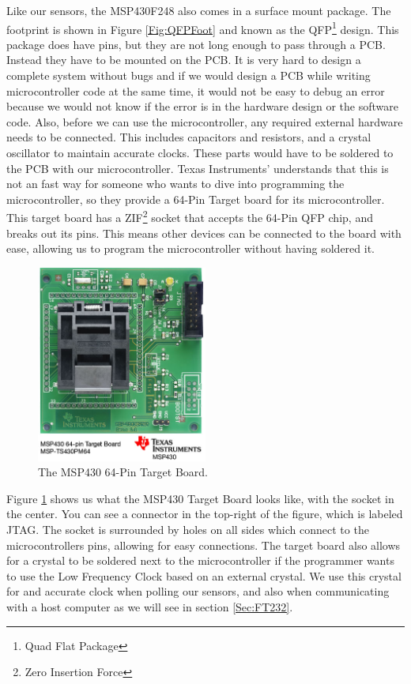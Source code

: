Like our sensors, the MSP430F248 also comes in a surface mount package.
The footprint is shown in Figure \ref{Fig:QFPFoot}
and known as the QFP\footnote{Quad Flat Package} design.
This package does have pins, but they are not long enough to pass through a PCB.
Instead they have to be mounted on the PCB.
It is very hard to design a complete system without bugs and if we would design a PCB
while writing microcontroller code at the same time,
it would not be easy to debug an error because we would not know if the error
is in the hardware design or the software code.
Also, before we can use the microcontroller,
any required external hardware needs to be connected.
This includes capacitors and resistors,
and a crystal oscillator to maintain accurate clocks.
These parts would have to be soldered to the PCB with our microcontroller.
Texas Instruments' understands that this is not an fast way for someone who wants to dive into programming the microcontroller,
so they provide a 64-Pin Target board for its microcontroller. This target board has
a ZIF\footnote{Zero Insertion Force} socket that accepts the 64-Pin QFP chip,
and breaks out its pins. This means other devices can be connected to the board with ease,
allowing us to program the microcontroller without having soldered it.
\begin{figure}
\begin{center}
\includegraphics[width=0.5\textwidth]{images/mspts430pm64.jpg}
\caption{The MSP430 64-Pin Target Board.}
\label{Fig:MSPTarget}
\end{center}
\end{figure}

Figure \ref{Fig:MSPTarget} shows us what the MSP430 Target Board \cite{Web:MSPTarget} looks like, with the socket in the center. You can see a connector in the top-right of the figure, which is labeled JTAG. The socket is surrounded by holes on all sides which connect to the microcontrollers pins, allowing for easy connections. The target board also allows for a crystal to be soldered next to the microcontroller if the programmer wants to use the Low Frequency Clock based on an external crystal. We use this crystal for and accurate clock when polling our sensors, and also when communicating with a host computer as we will see in section \ref{Sec:FT232}.

